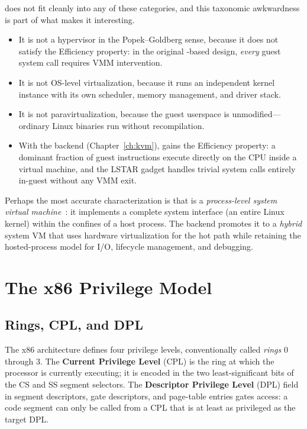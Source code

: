 \UML{} does not fit cleanly into any of these categories, and this
taxonomic awkwardness is part of what makes it interesting.

\begin{itemize}
  \item It is not a hypervisor in the Popek--Goldberg sense, because
        it does not satisfy the Efficiency property: in the original
        -based design, \emph{every} guest system call
        requires VMM intervention.
  \item It is not OS-level virtualization, because it runs an
        independent kernel instance with its own scheduler, memory
        management, and driver stack.
  \item It is not paravirtualization, because the guest userspace is
        unmodified---ordinary Linux binaries run without recompilation.
  \item With the \KVM{} backend (Chapter~\ref{ch:kvm}), \UML{}
        gains the Efficiency property: a dominant fraction of guest
        instructions execute directly on the CPU inside a \KVM{}
        virtual machine, and the LSTAR gadget handles trivial system
        calls entirely in-guest without any VMM exit.
\end{itemize}

Perhaps the most accurate characterization is that \UML{} is a
\emph{process-level system virtual machine}~\cite{smith2005book}:
it implements a complete system interface (an entire Linux kernel)
within the confines of a host process.  The \KVM{} backend promotes
it to a \emph{hybrid} system VM that uses hardware virtualization for
the hot path while retaining the hosted-process model for I/O,
lifecycle management, and debugging.


\section{The x86 Privilege Model}
\label{sec:foundations:privilege}

\subsection{Rings, CPL, and DPL}

The x86 architecture defines four privilege levels, conventionally
called \emph{rings} 0 through 3.  The \textbf{Current Privilege Level}
(CPL) is the ring at which the processor is currently executing; it is
encoded in the two least-significant bits of the CS and SS segment
selectors.  The \textbf{Descriptor Privilege Level} (DPL) field in
segment descriptors, gate descriptors, and page-table entries gates
access: a code segment can only be called from a CPL that is at least
as privileged as the target DPL.

